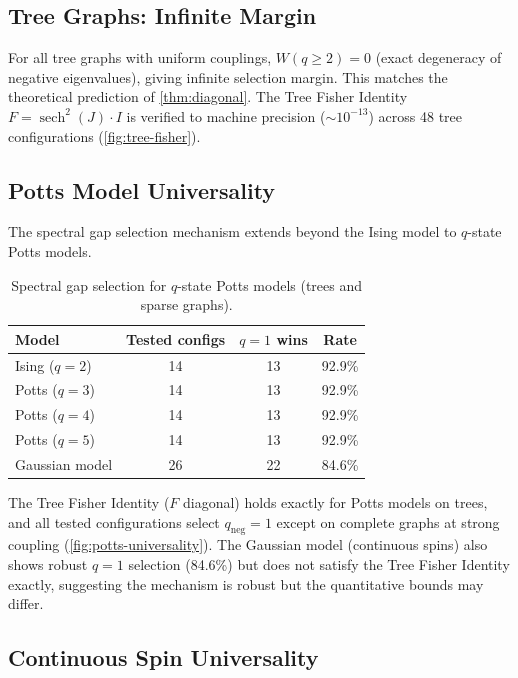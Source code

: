 \documentclass[11pt]{article}
\theoremstyle{definition}
\theoremstyle{remark}
\begin{document}
\subsection{Tree Graphs: Infinite Margin}

For all tree graphs with uniform couplings, $W(q \geq 2) = 0$ (exact
degeneracy of negative eigenvalues), giving infinite selection margin.
This matches the theoretical prediction of \cref{thm:diagonal}.
The Tree Fisher Identity $F = \operatorname{sech}^2(J) \cdot I$ is
verified to machine precision (${\sim}10^{-13}$) across 48 tree
configurations (\cref{fig:tree-fisher}).

\subsection{Potts Model Universality}

The spectral gap selection mechanism extends beyond the Ising model to
$q$-state Potts models.

\begin{table}[htbp]
\centering
\caption{Spectral gap selection for $q$-state Potts models (trees and sparse graphs).}
\label{tab:potts}
\begin{tabular}{@{}lccc@{}}
\toprule
Model & Tested configs & $q{=}1$ wins & Rate \\
\midrule
Ising ($q=2$) & 14 & 13 & 92.9\% \\
Potts ($q=3$) & 14 & 13 & 92.9\% \\
Potts ($q=4$) & 14 & 13 & 92.9\% \\
Potts ($q=5$) & 14 & 13 & 92.9\% \\
Gaussian model & 26 & 22 & 84.6\% \\
\bottomrule
\end{tabular}
\end{table}

The Tree Fisher Identity ($F$ diagonal) holds exactly for Potts models on trees,
and all tested configurations select $q_{\mathrm{neg}}=1$ except on complete
graphs at strong coupling (\cref{fig:potts-universality}). The Gaussian model
(continuous spins) also shows robust $q=1$ selection (84.6\%) but does not
satisfy the Tree Fisher Identity exactly, suggesting the mechanism is robust
but the quantitative bounds may differ.

\subsection{Continuous Spin Universality}
\label{sec:continuous-spin}
\end{document}
